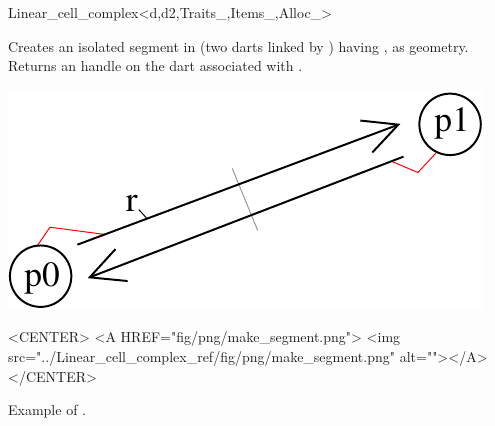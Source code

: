 \begin{ccRefClass}{Linear_cell_complex<d,d2,Traits_,Items_,Alloc_>}

{Creates an isolated segment in  (two darts linked by \betadeux{}) 
  having ,  as geometry.
  Returns an handle on the dart associated with .
}
% 
\def\LargFig{.3\textwidth}
\begin{ccTexOnly}
  \begin{center}
    \includegraphics[width=\LargFig]{Linear_cell_complex_ref/fig/pdf/make_segment}
  \end{center}
\end{ccTexOnly}
\begin{ccHtmlOnly}
  <CENTER>
  <A HREF="fig/png/make_segment.png">
  <img src="../Linear_cell_complex_ref/fig/png/make_segment.png" alt=""></A>
  </CENTER>
\end{ccHtmlOnly}
\centerline{Example of .}


\end{ccRefClass}
